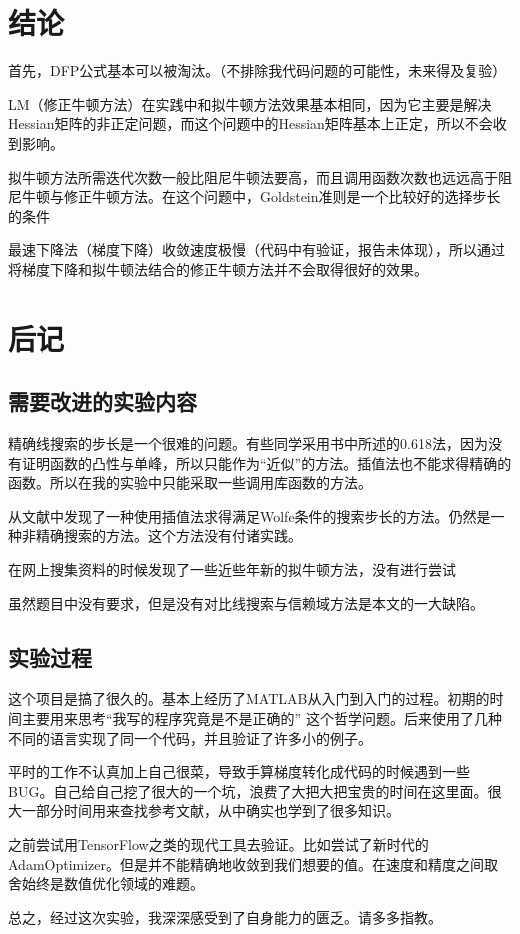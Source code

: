 \documentclass[11pt, a4paper]{article}
\begin{document}
\section{结论}

首先，DFP公式基本可以被淘汰。（不排除我代码问题的可能性，未来得及复验）

LM（修正牛顿方法）在实践中和拟牛顿方法效果基本相同，因为它主要是解决Hessian矩阵的非正定问题，而这个问题中的Hessian矩阵基本上正定，所以不会收到影响。

拟牛顿方法所需迭代次数一般比阻尼牛顿法要高，而且调用函数次数也远远高于阻尼牛顿与修正牛顿方法。在这个问题中，Goldstein准则是一个比较好的选择步长的条件

最速下降法（梯度下降）收敛速度极慢（代码中有验证，报告未体现），所以通过将梯度下降和拟牛顿法结合的修正牛顿方法并不会取得很好的效果。

\section{后记}
\subsection{需要改进的实验内容}

精确线搜索的步长是一个很难的问题。有些同学采用书中\cite{高立2014数}所述的0.618法，因为没有证明函数的凸性与单峰，所以只能作为“近似”的方法。插值法也不能求得精确的函数。所以在我的实验中只能采取一些调用库函数的方法。

从文献\cite{Nocedal2006NO}中发现了一种使用插值法求得满足Wolfe条件的搜索步长的方法。仍然是一种非精确搜索的方法。这个方法没有付诸实践。

在网上搜集资料的时候发现了一些近些年新的拟牛顿方法\cite{WEI20061156}，没有进行尝试

虽然题目中没有要求，但是没有对比线搜索与信赖域方法是本文的一大缺陷。

\subsection{实验过程}
这个项目是搞了很久的。基本上经历了MATLAB从入门到入门的过程。初期的时间主要用来思考“我写的程序究竟是不是正确的”
这个哲学问题。后来使用了几种不同的语言实现了同一个代码，并且验证了许多小的例子。

平时的工作不认真加上自己很菜，导致手算梯度转化成代码的时候遇到一些BUG。自己给自己挖了很大的一个坑，浪费了大把大把宝贵的时间在这里面。很大一部分时间用来查找参考文献，从中确实也学到了很多知识。

之前尝试用TensorFlow之类的现代工具去验证。比如尝试了新时代的AdamOptimizer。但是并不能精确地收敛到我们想要的值。在速度和精度之间取舍始终是数值优化领域的难题。

总之，经过这次实验，我深深感受到了自身能力的匮乏。请多多指教。
\newpage
{}


\end{document}
